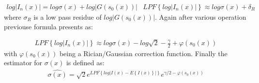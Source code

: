 \begin{equation}
\begin{aligned}log\left |  I_{n}(x)\right |=log\sigma(x)+log\left | G(s_{0}(x)) \right |\end{aligned}
\begin{aligned}LPF\left \{ log\left |  I_{n}(x)\right | \right \}\approx log\sigma(x)+\delta _{R}\end{aligned}
\end{equation}
where $\sigma_{R}$ is a low pass residue of $log\left | G(s_{0}(x)) \right |$. Again after various operation previouse formula presents as:

\begin{equation}
\begin{aligned}LPF\left \{ log\left |  I_{n}(x)\right | \right \}\approx log\sigma(x)-log\sqrt{2}-\frac{\gamma }{2}+\varphi (s_{0}(x))\end{aligned}
\end{equation}
with $\varphi (s_{0}(x))$ being a Rician/Gaussian correction function. Finally the estimator for $\sigma(x)$ is defined as:
\begin{equation}
\begin{aligned}\widehat{\sigma(x)}=\sqrt{2}e^{LPF\left \{ log\left | I(x)-E\left \{ I(x) \right \} \right | \right \}}e^{{\gamma/2}-\varphi (s_{0}(x))}\end{aligned}
\end{equation}
